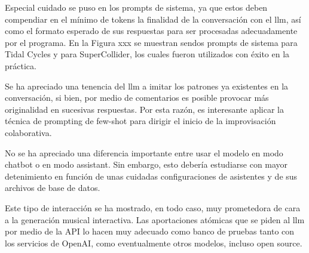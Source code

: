 Especial cuidado se puso en los prompts de sistema, ya que estos deben compendiar en el mínimo de tokens la finalidad de la conversación con el \gls{llm}, así como el formato esperado de sus respuestas para ser procesadas adecuadamente por el programa. En la Figura xxx se muestran sendos prompts de sistema para Tidal Cycles y para SuperCollider, los cuales fueron utilizados con éxito en la práctica.


Se ha apreciado una tenencia del \gls{llm} a imitar los patrones ya existentes en la conversación, si bien, por medio de comentarios es posible provocar más originalidad en sucesivas respuestas. Por esta razón, es interesante aplicar la técnica de prompting de few-shot para dirigir el inicio de la improvisación colaborativa. 

No se ha apreciado una diferencia importante entre usar el modelo en modo chatbot o en modo assistant. Sin embargo, esto debería estudiarse con mayor detenimiento en función de unas cuidadas configuraciones de asistentes y de sus archivos de base de datos.

Este tipo de interacción se ha mostrado, en todo caso, muy prometedora de cara a la generación musical interactiva. Las aportaciones atómicas que se piden al \gls{llm} por medio de la API lo hacen muy adecuado como banco de pruebas tanto con los servicios de OpenAI, como eventualmente otros modelos, incluso open source.



